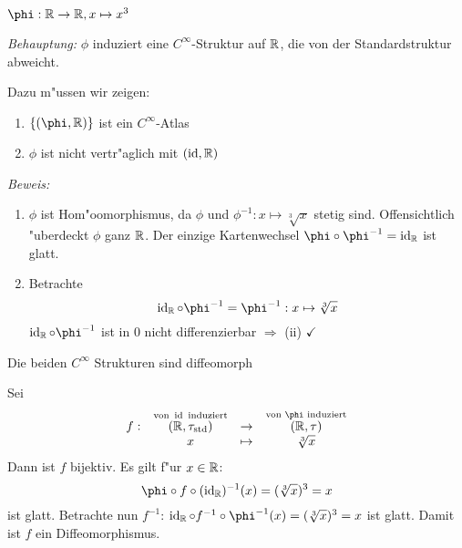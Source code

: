 \begin{Loes}
$\phi: \R \to \R, x \mapsto x^3$

\emph{Behauptung:} $\phi$ induziert eine $C^\infty$-Struktur auf $\operatorname{\mathbb{R}}$, die von der Standardstruktur abweicht.

Dazu m"ussen wir zeigen:\begin{enumerate}[font=\normalfont,label=(\roman*)]
\item
	$\{(\phi, \R)\}$ ist ein $C^\infty$-Atlas
\item
	$\phi$ ist nicht vertr"aglich mit $(\operatorname{id}, \operatorname{\mathbb{R}})$
\end{enumerate}
\emph{Beweis:}\begin{enumerate}[leftmargin=*,widest=ii,font=\normalfont,label=(\roman*)]
\item
	$\phi$ ist Hom"oomorphismus, da $\phi$ und $\phi^{-1}: x \mapsto \sqrt[3]{x}$ stetig sind. Offensichtlich "uberdeckt $\phi$ ganz $\operatorname{\mathbb{R}}$. Der einzige Kartenwechsel $\phi \circ \phi^{-1} = \Id_{\R}$ ist glatt.
\item
	Betrachte
		\[ \Id_{\R} \circ \phi^{-1} = \phi^{-1}: x \mapsto \sqrt[3]{x} \]
	$\Id_{\R} \circ \phi^{-1}$ ist in $0$ nicht differenzierbar $\Rightarrow$ (ii) $\checkmark$
\end{enumerate}
\begin{description}[font=\normalfont\itshape,leftmargin=*]
\item[Behauptung:]
	Die beiden $C^\infty$ Strukturen sind diffeomorph
\item[Beweis:]
	Sei
		\[\begin{array}{cccc} f:&  \overset{\text{von } \Id \text{ induziert}}{(\R, \tau_{\text{std}})} &\to& \overset{\text{von } \phi \text{ induziert}}{(\R, \tau)} \\
			& x &\mapsto& \sqrt[3]{x} \end{array}\]
	Dann ist $f$ bijektiv. Es gilt f"ur $x \in \operatorname{\mathbb{R}}$:
		\[ \phi \circ f \circ (\Id_{\R})^{-1} (x) = (\sqrt[3]{x})^3 = x \]
	ist glatt. Betrachte nun $f^{-1}$: $\Id_{\R} \circ f^{-1} \circ \phi^{-1}(x) = (\sqrt[3]{x})^3 = x$ ist glatt. Damit ist $f$ ein Diffeomorphismus.
\end{description}
\end{Loes}

